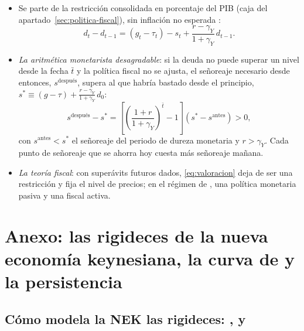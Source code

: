\documentclass[11pt]{article}
\begin{document}
\begin{itemize}
\item Se parte de la restricción consolidada en porcentaje del PIB (caja del apartado~\ref{sec:politica-fiscal}), sin inflación no esperada :
  \begin{equation*}
  d_t-d_{t-1}=(g_t-\tau_t)-s_t+\frac{r-\gamma_Y}{1+\gamma_Y}\,d_{t-1}.
  \end{equation*}
\item \emph{La aritmética monetarista desagradable}\nocite{SargentWallace1981}: si la deuda no puede superar un nivel desde la fecha $\bar t$ y la política fiscal no se ajusta, el señoreaje necesario desde entonces, $s^{\text{después}}$, supera al que habría bastado desde el principio, $s^*\equiv(g-\tau)+\frac{r-\gamma_Y}{1+\gamma_Y}\,d_0$:
  \begin{equation*}
  s^{\text{después}}-s^*=\left[\left(\frac{1+r}{1+\gamma_Y}\right)^{\bar t}-1\right]\left(s^*-s^{\text{antes}}\right)>0 ,
  \end{equation*}
  con $s^{\text{antes}}<s^*$ el señoreaje del periodo de dureza monetaria y $r>\gamma_Y$. Cada punto de señoreaje que se ahorra hoy cuesta más señoreaje mañana.
\item \emph{La teoría fiscal}: con superávits futuros dados, \eqref{eq:valoracion} deja de ser una restricción y fija el nivel de precios; en el régimen de \textcite{Leeper1991}, una política monetaria pasiva y una fiscal activa.
\end{itemize}

\section{Anexo: las rigideces de la nueva economía keynesiana,\cortetitulo{} la curva de  y la persistencia}\label{anexo:persistencia}

\subsection{Cómo modela la NEK las rigideces: ,  y }\label{anexo:rigideces}
\end{document}
